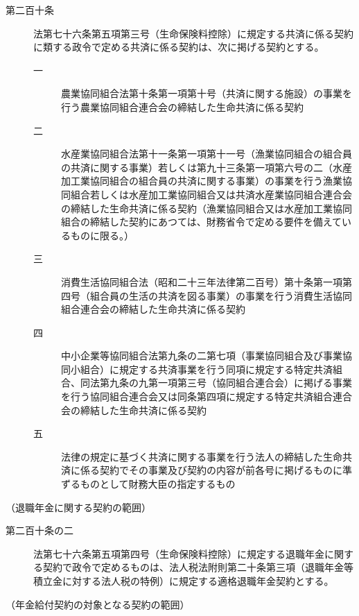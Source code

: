 \documentclass[twocolumn,a4j,10pt]{ltjtarticle}
\begin{document}
\begin{description}
\item[第二百十条]法第七十六条第五項第三号（生命保険料控除）に規定する共済に係る契約に類する政令で定める共済に係る契約は、次に掲げる契約とする。
\begin{description}
\item[一]農業協同組合法第十条第一項第十号（共済に関する施設）の事業を行う農業協同組合連合会の締結した生命共済に係る契約
\item[二]水産業協同組合法第十一条第一項第十一号（漁業協同組合の組合員の共済に関する事業）若しくは第九十三条第一項第六号の二（水産加工業協同組合の組合員の共済に関する事業）の事業を行う漁業協同組合若しくは水産加工業協同組合又は共済水産業協同組合連合会の締結した生命共済に係る契約（漁業協同組合又は水産加工業協同組合の締結した契約にあつては、財務省令で定める要件を備えているものに限る。）
\item[三]消費生活協同組合法（昭和二十三年法律第二百号）第十条第一項第四号（組合員の生活の共済を図る事業）の事業を行う消費生活協同組合連合会の締結した生命共済に係る契約
\item[四]中小企業等協同組合法第九条の二第七項（事業協同組合及び事業協同小組合）に規定する共済事業を行う同項に規定する特定共済組合、同法第九条の九第一項第三号（協同組合連合会）に掲げる事業を行う協同組合連合会又は同条第四項に規定する特定共済組合連合会の締結した生命共済に係る契約
\item[五]法律の規定に基づく共済に関する事業を行う法人の締結した生命共済に係る契約でその事業及び契約の内容が前各号に掲げるものに準ずるものとして財務大臣の指定するもの
\end{description}
\end{description}
\noindent\hspace{10pt}（退職年金に関する契約の範囲）
\begin{description}
\item[第二百十条の二]法第七十六条第五項第四号（生命保険料控除）に規定する退職年金に関する契約で政令で定めるものは、法人税法附則第二十条第三項（退職年金等積立金に対する法人税の特例）に規定する適格退職年金契約とする。
\end{description}
\noindent\hspace{10pt}（年金給付契約の対象となる契約の範囲）
\end{document}
